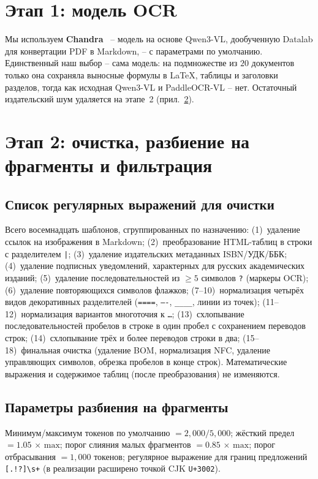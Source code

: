 \documentclass{article}
\begin{document}
\section{Этап 1: модель OCR}\label{app:ocr}

Мы используем \textbf{Chandra}~\cite{chandra} -- модель на основе Qwen3-VL, дообученную Datalab для конвертации PDF в Markdown, -- с параметрами по умолчанию. Единственный наш выбор -- сама модель: на подмножестве из $20$ документов только она сохраняла выносные формулы в LaTeX, таблицы и заголовки разделов, тогда как исходная Qwen3-VL и PaddleOCR-VL -- нет. Остаточный издательский шум удаляется на этапе~2 (прил.~\ref{app:clean}).

\section{Этап 2: очистка, разбиение на фрагменты и фильтрация}\label{app:clean}

\subsection{Список регулярных выражений для очистки}
Всего восемнадцать шаблонов, сгруппированных по назначению: (1)~удаление ссылок на изображения в Markdown; (2)~преобразование HTML-таблиц в строки с разделителем \texttt{|}; (3)~удаление издательских метаданных ISBN/УДК/ББК; (4)~удаление подписных уведомлений, характерных для русских академических изданий; (5)~удаление последовательностей из $\geq 5$ символов \texttt{?} (маркеры OCR); (6)~удаление повторяющихся символов флажков; (7--10)~нормализация четырёх видов декоративных разделителей (\texttt{====}, \texttt{----}, \texttt{\_\_\_\_}, линии из точек); (11--12)~нормализация вариантов многоточия к \texttt{\dots}; (13)~схлопывание последовательностей пробелов в строке в один пробел с сохранением переводов строк; (14)~схлопывание трёх и более переводов строки в два; (15--18)~финальная очистка (удаление BOM, нормализация NFC, удаление управляющих символов, обрезка пробелов в конце строк). Математические выражения и содержимое таблиц (после преобразования) не изменяются.

\subsection{Параметры разбиения на фрагменты}
Минимум/максимум токенов по умолчанию $= 2{,}000 / 5{,}000$; жёсткий предел $= 1.05\,\times\,\mathrm{max}$; порог слияния малых фрагментов $= 0.85\,\times\,\mathrm{max}$; порог отбрасывания $= 1{,}000$ токенов; регулярное выражение для границ предложений \verb|[.!?]\s+| (в реализации расширено точкой CJK \texttt{U+3002}).
\end{document}
